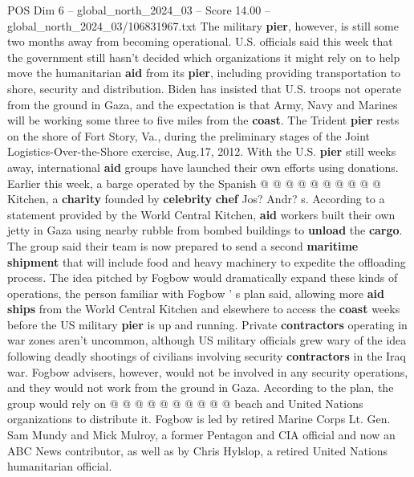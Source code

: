 \begin{textsample}{POS Dim 6 – global\_north\_2024\_03 – Score 14.00 – global\_north\_2024\_03/106831967.txt}
The military \textbf{pier}, however, is still some two months away from becoming operational.
U.S. officials said this week that the government still hasn't decided which organizations it might rely on to help move the humanitarian \textbf{aid} from its \textbf{pier}, including providing transportation to shore, security and distribution.
Biden has insisted that U.S. troops not operate from the ground in Gaza, and the expectation is that Army, Navy and Marines will be working some three to five miles from the \textbf{coast}.
The Trident \textbf{pier} rests on the shore of Fort Story, Va., during the preliminary stages of the Joint Logistics-Over-the-Shore exercise, Aug.17, 2012.
With the U.S. \textbf{pier} still weeks away, international \textbf{aid} groups have launched their own efforts using donations.
Earlier this week, a barge operated by the Spanish @ @ @ @ @ @ @ @ @ @ Kitchen, a \textbf{charity} founded by \textbf{celebrity} \textbf{chef} Jos?
Andr? s.
According to a statement provided by the World Central Kitchen, \textbf{aid} workers built their own jetty in Gaza using nearby rubble from bombed buildings to \textbf{unload} the \textbf{cargo}.
The group said their team is now prepared to send a second \textbf{maritime} \textbf{shipment} that will include food and heavy machinery to expedite the offloading process.
The idea pitched by Fogbow would dramatically expand these kinds of operations, the person familiar with Fogbow ' s plan said, allowing more \textbf{aid} \textbf{ships} from the World Central Kitchen and elsewhere to access the \textbf{coast} weeks before the US military \textbf{pier} is up and running.
Private \textbf{contractors} operating in war zones aren't uncommon, although US military officials grew wary of the idea following deadly shootings of civilians involving security \textbf{contractors} in the Iraq war.
Fogbow advisers, however, would not be involved in any security operations, and they would not work from the ground in Gaza.
According to the plan, the group would rely on @ @ @ @ @ @ @ @ @ @ beach and United Nations organizations to distribute it.
Fogbow is led by retired Marine Corps Lt.
Gen.
Sam Mundy and Mick Mulroy, a former Pentagon and CIA official and now an ABC News contributor, as well as by Chris Hylslop, a retired United Nations humanitarian official.

\end{textsample}
